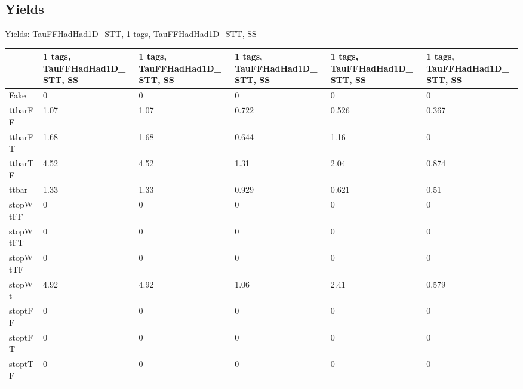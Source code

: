
\subsection{Yields}

\begin{frame}{Yields: TauFFHadHad1D\_STT, 1 tags, TauFFHadHad1D\_STT, SS}
\begin{center}
  \begin{tabular}{l| >{\centering\let\newline\\\arraybackslash\hspace{0pt}}m{1.4cm}| >{\centering\let\newline\\\arraybackslash\hspace{0pt}}m{1.4cm}| >{\centering\let\newline\\\arraybackslash\hspace{0pt}}m{1.4cm}| >{\centering\let\newline\\\arraybackslash\hspace{0pt}}m{1.4cm}| >{\centering\let\newline\\\arraybackslash\hspace{0pt}}m{1.4cm}}
    & 1 tags, TauFFHadHad1D\_STT, SS & 1 tags, TauFFHadHad1D\_STT, SS & 1 tags, TauFFHadHad1D\_STT, SS & 1 tags, TauFFHadHad1D\_STT, SS & 1 tags, TauFFHadHad1D\_STT, SS \\
 \hline \hline
    Fake& 0 & 0 & 0 & 0 & 0 \\
 \hline
    ttbarFF& 1.07 & 1.07 & 0.722 & 0.526 & 0.367 \\
 \hline
    ttbarFT& 1.68 & 1.68 & 0.644 & 1.16 & 0 \\
 \hline
    ttbarTF& 4.52 & 4.52 & 1.31 & 2.04 & 0.874 \\
 \hline
    ttbar& 1.33 & 1.33 & 0.929 & 0.621 & 0.51 \\
 \hline
    stopWtFF& 0 & 0 & 0 & 0 & 0 \\
 \hline
    stopWtFT& 0 & 0 & 0 & 0 & 0 \\
 \hline
    stopWtTF& 0 & 0 & 0 & 0 & 0 \\
 \hline
    stopWt& 4.92 & 4.92 & 1.06 & 2.41 & 0.579 \\
 \hline
    stoptFF& 0 & 0 & 0 & 0 & 0 \\
 \hline
    stoptFT& 0 & 0 & 0 & 0 & 0 \\
 \hline
    stoptTF& 0 & 0 & 0 & 0 & 0 \\

\end{tabular}
\end{center}
\end{frame}
